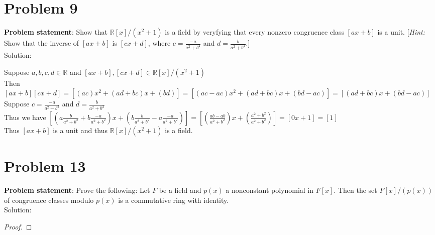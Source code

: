 \documentclass{article} %
\begin{document}
\newpage

\section*{Problem 9}


\textbf{Problem statement}: Show that $\mathbb{R}[x]/(x^2+1)$ is a field by veryfying that every nonzero congruence class $[ax + b]$ is a unit.  [\textit{Hint: } Show that the inverse of $[ax + b]$ is $[cx + d]$, where $c = \frac{-a}{a^2 + b^2}$ and $d = \frac{b}{a^2 + b^2}$.]
\\

Solution: 
\begin{addmargin}[1em]{0em}
Suppose $a,b,c,d \in \mathbb{R}$ and $[ax + b], [cx + d] \in \mathbb{R}[x]/(x^2+1)$
\\Then $[ax + b][cx + d] = [(ac)x^2 + (ad + bc)x + (bd)] = [(ac - ac)x^2 + (ad + bc)x + (bd - ac)] = [(ad + bc)x + (bd - ac)]$
\\Suppose $c = \frac{-a}{a^2 + b^2}$ and $d = \frac{b}{a^2 + b^2}$
\\Thus we have $[(a\frac{b}{a^2 + b^2} + b\frac{-a}{a^2 + b^2})x + (b\frac{b}{a^2 + b^2} - a\frac{-a}{a^2 + b^2})] = [(\frac{ab - ab}{a^2 + b^2})x + (\frac{a^2 + b^2}{a^2 + b^2})] = [0x + 1] = [1]$
\\Thus $[ax + b]$ is a unit and thus $\mathbb{R}[x]/(x^2 + 1)$ is a field.
\end{addmargin}

\newpage

\section*{Problem 13}


\textbf{Problem statement}: Prove the following: Let $F$  be a field and $p(x)$ a nonconstant polynomial in $F[x]$.  Then the set $F[x]/(p(x))$ of congruence classes modulo $p(x)$ is a commutative ring with identity.
\\

Solution: 
\begin{addmargin}[1em]{0em}
\begin{proof}

\end{proof}
\end{addmargin}
\end{document}
